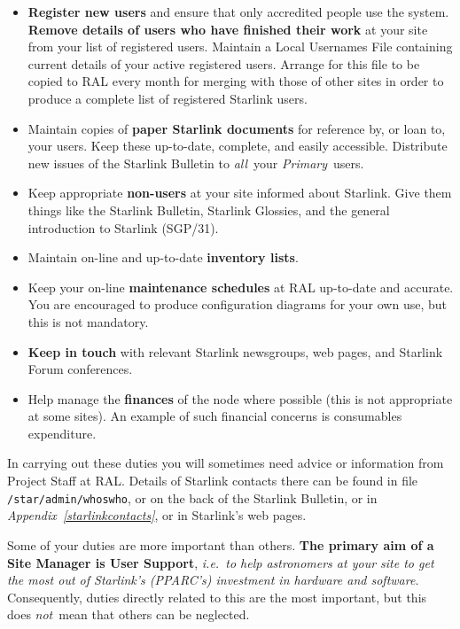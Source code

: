 \documentclass[twoside,11pt]{article}
\newcommand{\xref}[3]{#1}
\begin{document}
\begin{itemize}
\item {\bf Register new users} and ensure that only accredited people use the
system.
{\bf Remove details of users who have finished their work} at your site from
your list of registered users.
Maintain a Local Usernames File containing current details of your active
registered users.
Arrange for this file to be copied to RAL every month for merging with those of
other sites in order to produce a complete list of registered Starlink users.

\item Maintain copies of {\bf paper Starlink documents} for reference by, or
loan to, your users.
Keep these up-to-date, complete, and easily accessible.
Distribute new issues of the Starlink Bulletin to {\em all}\, your
{\em Primary}\, users.

\item Keep appropriate {\bf non-users} at your site informed about Starlink.
Give them things like the Starlink Bulletin, Starlink Glossies, and the
general introduction to Starlink
(\xref{SGP/31}{sgp31}{}).

\item Maintain on-line and up-to-date {\bf inventory lists}.

\item Keep your on-line {\bf maintenance schedules} at RAL up-to-date and
accurate.
You are encouraged to produce configuration diagrams for your own use,
but this is not mandatory.

\item {\bf Keep in touch} with relevant Starlink newsgroups, web pages, and
Starlink Forum conferences.

\item Help manage the {\bf finances} of the node where possible (this is not
appropriate at some sites).
An example of such financial concerns is consumables expenditure.

\end{itemize}

In carrying out these duties you will sometimes need advice or information
from Project Staff at RAL.
Details of Starlink contacts there can be found in file
{\tt /star/admin/whoswho}, or on the back of the Starlink Bulletin, or in
{\em Appendix~\ref{starlinkcontacts}},
or in Starlink's web pages.

Some of your duties are more important than others.
{\bf The primary aim of a Site Manager is User Support}, {\em i.e.\ to
help astronomers at your site to get the most out of Starlink's (PPARC's)
investment in hardware and software.} 
Consequently, duties directly related to this are the most important, but this
does {\em not}\, mean that others can be neglected.
 
\end{document}
